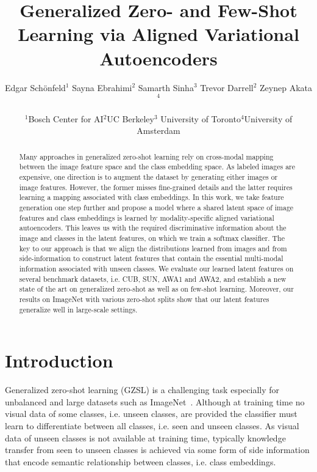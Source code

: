 \documentclass[10pt,twocolumn,letterpaper]{article}
\begin{document}
\title{Generalized Zero- and Few-Shot Learning via Aligned Variational Autoencoders}

\author{
 Edgar Sch{\"o}nfeld$^{1}$ \hspace{4mm} Sayna Ebrahimi$^{2}$ \hspace{4mm} Samarth Sinha$^{3}$ \hspace{4mm} Trevor Darrell$^{2}$ \hspace{4mm} Zeynep Akata$^{4}$\vspace{4mm} \\ 
  \begin{tabular}{cccc}
  $^{1}$Bosch Center for AI & $^{2}$UC Berkeley  &  $^{3}$ University of Toronto & $^{4}$University of Amsterdam \end{tabular}
 }



\maketitle


\begin{abstract}
Many approaches in generalized zero-shot learning rely on cross-modal mapping between the image feature space and the class embedding space. As labeled images are expensive, one direction is to augment the dataset by generating either images or image features. However, the former misses fine-grained details and the latter requires learning a mapping associated with class embeddings. In this work, we take feature generation one step further and propose a model where a shared latent space of image features and class embeddings is learned by modality-specific aligned variational autoencoders. This leaves us with the required discriminative information about the image and classes in the latent features, on which we train a softmax classifier.
  The key to our approach is that we align the distributions learned from images and from side-information to construct latent features that contain the essential multi-modal information associated with unseen classes. We evaluate our learned latent features on several benchmark datasets, i.e. CUB, SUN, AWA1 and AWA2, and establish a new state of the art on generalized zero-shot as well as on few-shot learning. Moreover, our results on ImageNet with various zero-shot splits show that our latent features generalize well in large-scale settings.
\end{abstract}



\section{Introduction}
Generalized zero-shot learning (GZSL) is a challenging task especially for unbalanced and large datasets such as ImageNet~\cite{deng2009imagenet}. Although at training time no visual data of some classes, i.e. unseen classes, are provided the classifier must learn to differentiate between all classes, i.e. seen and unseen classes. As visual data of unseen classes is not available at training time, typically knowledge transfer from seen to unseen classes is achieved via some form of side information that encode semantic relationship between classes, i.e. class embeddings. 
\end{document}
